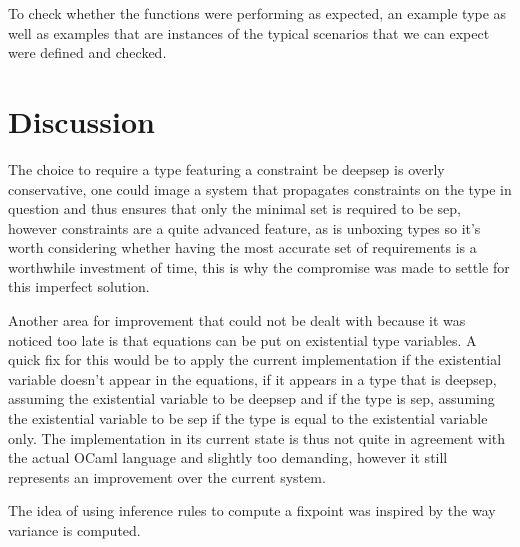 \documentclass[a4]{article}
\begin{document}
To check whether the functions were performing as expected, an example type as well as examples that are instances of the typical scenarios that we can expect were defined and checked.

\section{Discussion}

The choice to require a type featuring a constraint be deepsep is overly conservative, one could image a system that propagates constraints on the type in question and thus ensures that only the minimal set is required to be sep, however constraints are a quite advanced feature, as is unboxing types so it's worth considering whether having the most accurate set of requirements is a worthwhile investment of time, this is why the compromise was made to settle for this imperfect solution.

Another area for improvement that could not be dealt with because it was noticed too late is that equations can be put on existential type variables. A quick fix for this would be to apply the current implementation if the existential variable doesn't appear in the equations, if it appears in a type that is deepsep, assuming the existential variable to be deepsep and if the type is sep, assuming the existential variable to be sep if the type is equal to the existential variable only. The implementation in its current state is thus not quite in agreement with the actual OCaml language and slightly too demanding, however it still represents an improvement over the current system.

The idea of using inference rules to compute a fixpoint was inspired by the way variance is computed. 
\end{document}
